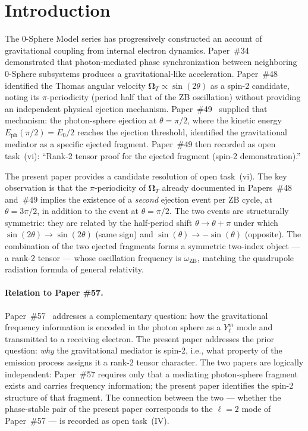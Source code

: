 \documentclass[%
 reprint, amsmath,amssymb, aps, prb, ]{revtex4-2}
\numberwithin{equation}{section}
\newcommand{\iphase}{\theta}
\newcommand{\omZB}{\omega_{\text{ZB}}}
\newcommand{\OmT}{\boldsymbol{\Omega}_T}
\begin{document}
\maketitle

\section{Introduction}
\label{sec:intro}

The 0-Sphere Model series has progressively constructed an account of gravitational coupling from internal electron dynamics.
Paper~\#34~\cite{hanamura34} demonstrated that photon-mediated phase synchronization between neighboring 0-Sphere subsystems produces a gravitational-like acceleration.
Paper~\#48~\cite{hanamura48} identified the Thomas angular velocity $\OmT \propto \sin(2\iphase)$ as a spin-2 candidate, noting its $\pi$-periodicity (period half that of the ZB oscillation) without providing an independent physical ejection mechanism.
Paper~\#49~\cite{hanamura49} supplied that mechanism: the photon-sphere ejection at $\iphase = \pi/2$, where the kinetic energy $E_\mathrm{ph}(\pi/2) = E_0/2$ reaches the ejection threshold, identified the gravitational mediator as a specific ejected fragment.
Paper~\#49 then recorded as open task~(vi): ``Rank-2 tensor proof for the ejected fragment (spin-2 demonstration).''

The present paper provides a candidate resolution of open task~(vi).
The key observation is that the $\pi$-periodicity of $\OmT$ already documented in Papers~\#48 and~\#49 implies the existence of a \emph{second} ejection event per ZB cycle, at $\iphase = 3\pi/2$, in addition to the event at $\iphase = \pi/2$.
The two events are structurally symmetric: they are related by the half-period shift $\iphase \to \iphase + \pi$ under which $\sin(2\iphase) \to \sin(2\iphase)$ (same sign) and $\sin(\iphase) \to -\sin(\iphase)$ (opposite).
The combination of the two ejected fragments forms a symmetric two-index object --- a rank-2 tensor --- whose oscillation frequency is $\omZB$, matching the quadrupole radiation formula of general relativity.

\paragraph{Relation to Paper \#57.}
Paper~\#57~\cite{hanamura57} addresses a complementary question: how the gravitational frequency information is encoded in the photon sphere as a $Y_\ell^m$ mode and transmitted to a receiving electron.
The present paper addresses the prior question: \emph{why} the gravitational mediator is spin-2, i.e., what property of the emission process assigns it a rank-2 tensor character.
The two papers are logically independent: Paper~\#57 requires only that a mediating photon-sphere fragment exists and carries frequency information; the present paper identifies the spin-2 structure of that fragment.
The connection between the two --- whether the phase-stable pair of the present paper corresponds to the $\ell = 2$ mode of Paper~\#57 --- is recorded as open task~(IV).
\end{document}
